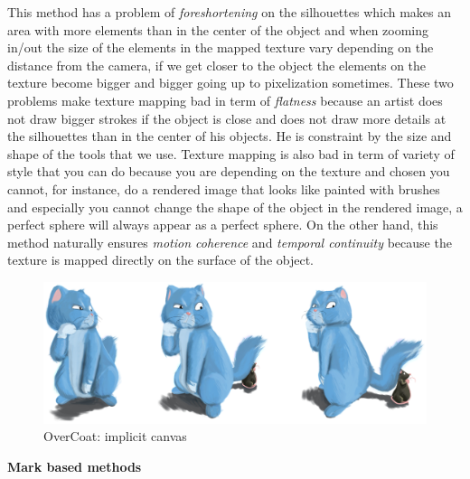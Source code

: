 This method has a problem of \textit{foreshortening} on the silhouettes which makes an area with more elements than in the center of the object and when zooming in/out the size of the elements in the mapped texture vary depending on the distance from the camera, if we get closer to the object the elements on the texture become bigger and bigger going up to pixelization sometimes. These two problems make texture mapping bad in term of \textit{flatness} because an artist does not draw bigger strokes if the object is close and does not draw more details at the silhouettes than in the center of his objects. He is constraint by the size and shape of the tools that we use. Texture mapping is also bad in term of variety of style that you can do because you are depending on the texture and chosen you cannot, for instance, do a rendered image that looks like painted with brushes and especially you cannot change the shape of the object in the rendered image, a perfect sphere will always appear as a perfect sphere. On the other hand, this method naturally ensures \textit{motion coherence} and \textit{temporal continuity} because the texture is mapped directly on the surface of the object. \newline




\begin{figure}
    \begin{center}

    \includegraphics[scale=0.5]{images/overcoat.jpg}
    \end{center}
    \caption{OverCoat: implicit canvas \cite{schmid_overcoat:_2011}}
    \label{overcoat_figure}
\end{figure}

\textbf{Mark based methods}

